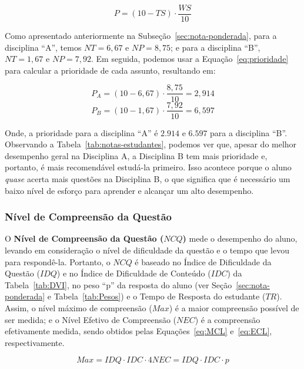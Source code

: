 \begin{equation}
    \label{eq:prioridade}
    P = (10 - TS)\cdot \frac{WS}{10}
\end{equation}

Como apresentado anteriormente na Subseção~\ref{sec:nota-ponderada}, para a disciplina ``A'', temos $NT = 6,67 $ e $NP = 8,75$; e para a disciplina ``B'', $NT = 1,67 $ e $NP = 7,92$. Em seguida, podemos usar a Equação~\ref{eq:prioridade} para calcular a prioridade de cada assunto, resultando em:

$$ P_A = (10 - 6,67) \cdot \frac{8,75}{10} = 2,914$$
$$ P_B = (10 - 1,67) \cdot \frac{7,92}{10} = 6,597$$

Onde, a prioridade para a disciplina ``A'' é $2.914 $ e $6.597$ para a disciplina ``B''. Observando a Tabela~\ref{tab:notas-estudantes}, podemos ver que, apesar do melhor desempenho geral na Disciplina A, a Disciplina B tem mais prioridade e, portanto, é mais recomendável estudá-la primeiro. Isso acontece porque o aluno \textit{quase} acerta mais questões na Disciplina B, o que significa que é necessário um baixo nível de esforço para aprender e alcançar um alto desempenho.


\subsubsection{Nível de Compreensão da Questão}\label{sec:compreensao-questao}

O \textbf{Nível de Compreensão da Questão ($NCQ$)} mede o desempenho do aluno, levando em consideração o nível de dificuldade da questão e o tempo que levou para respondê-la. Portanto, o $NCQ$ é baseado no Índice de Dificuldade da Questão ($IDQ$) e no Índice de Dificuldade de Conteúdo ($IDC$) da Tabela~\ref{tab:DVI}, no peso ``p'' da resposta do aluno (ver Seção~\ref{sec:nota-ponderada} e Tabela~\ref{tab:Pesos}) e o Tempo de Resposta do estudante ($TR$). Assim, o nível máximo de compreensão ($Max$) é a maior compreensão possível de ser medida; e o Nível Efetivo de Compreensão ($NEC$) é a compreensão efetivamente medida, sendo obtidos pelas Equações~\ref{eq:MCL} e~\ref{eq:ECL}, respectivamente.

\begin{subequations}
\label{eq:MaxNEC}
\begin{equation}\label{eq:MCL}
Max = IDQ\cdot IDC \cdot 4
\end{equation}
\begin{equation}\label{eq:ECL}
NEC = IDQ \cdot IDC \cdot p
\end{equation}
\end{subequations}

